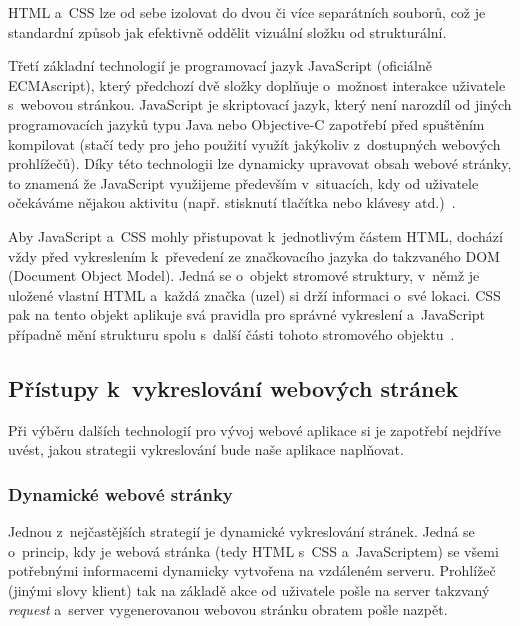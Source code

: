 HTML a~CSS lze od sebe izolovat do dvou či více separátních souborů, což je standardní způsob jak efektivně oddělit vizuální složku od strukturální.

Třetí základní technologií je programovací jazyk JavaScript (oficiálně ECMAscript), který předchozí dvě složky doplňuje o~možnost interakce uživatele s~webovou stránkou. JavaScript je skriptovací jazyk, který není narozdíl od jiných programovacích jazyků typu Java nebo Objective-C zapotřebí před spuštěním kompilovat (stačí tedy pro jeho použití využít jakýkoliv z~dostupných webových prohlížečů). Díky této technologii lze dynamicky upravovat obsah webové stránky, to znamená že JavaScript využijeme především v~situacích, kdy od uživatele očekáváme nějakou aktivitu (např. stisknutí tlačítka nebo klávesy atd.)~\parencite{javascript}.

Aby JavaScript a~CSS mohly přistupovat k~jednotlivým částem HTML, dochází vždy před vykreslením k~převedení ze značkovacího jazyka do takzvaného DOM (Document Object Model). Jedná se o~objekt stromové struktury, v~němž je uložené vlastní HTML a~každá značka (uzel) si drží informaci o~své lokaci. CSS pak na tento objekt aplikuje svá pravidla pro správné vykreslení a~JavaScript případně mění strukturu spolu s~další části tohoto stromového objektu~\parencite{howbrowserswork}.

\hypertarget{pux159uxedstupy-k-vykreslovuxe1nuxed-webovuxfdch-struxe1nek}{%
\subsection{Přístupy k~vykreslování webových stránek}\label{pux159uxedstupy-k-vykreslovuxe1nuxed-webovuxfdch-struxe1nek}}

Při výběru dalších technologií pro vývoj webové aplikace si je zapotřebí nejdříve uvést, jakou strategii vykreslování bude naše aplikace naplňovat.

\hypertarget{dynamickuxe9-webovuxe9-struxe1nky}{%
\subsubsection{Dynamické webové stránky}\label{dynamickuxe9-webovuxe9-struxe1nky}}

Jednou z~nejčastějších strategií je dynamické vykreslování stránek. Jedná se o~princip, kdy je webová stránka (tedy HTML s~CSS a~JavaScriptem) se všemi potřebnými informacemi dynamicky vytvořena na vzdáleném serveru. Prohlížeč (jinými slovy klient) tak na základě akce od uživatele pošle na server takzvaný \emph{request} a~server vygenerovanou webovou stránku obratem pošle nazpět.

